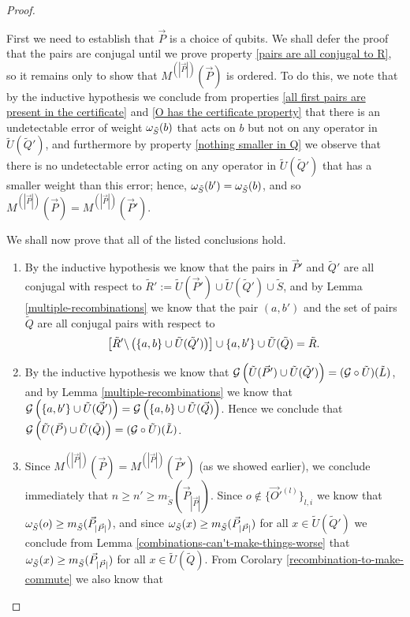 \documentclass[twocolumn,showpacs,preprintnumbers,amsmath,amssymb,nofootinbib,pra,floatfix]{revtex4-1}
\newcommand{\lst}{\vec}
\newcommand{\set}{\tilde}
\newcommand{\genfun}{\mathcal{G}}
\begin{document}
\begin{proof}
\begin{description}
First we need to establish that $\lst P$ is a choice of qubits.  We shall defer the proof that the pairs are conjugal until we prove property \ref{pairs are all conjugal to R}, so it remains only to show that $M^{(|\lst P|)}(\lst P)$ is ordered.  To do this, we note that by the inductive hypothesis we conclude from properties \ref{all first pairs are present in the certificate} and \ref{O has the certificate property} that there is an  undetectable error of weight $\om_{\set S}(b)$ that acts on $b$ but not on any operator in $\set U(\set Q')$, and furthermore by property \ref{nothing smaller in Q} we observe that there is no undetectable error acting on any operator in $\set U(\set Q')$ that has a smaller weight than this error;  hence, $\om_{\set S}(b')=\om_{\set S}(b)$, and so $M^{(|\lst P|)}(\lst P)=M^{(|\lst P|)}(\lst P')$.

We shall now prove that all of the listed conclusions hold.
\begin{enumerate}
\item By the inductive hypothesis we know that the pairs in $\lst P'$ and $\set Q'$ are all conjugal with respect to $\set R' := \set U(\lst P')\cup \set U(\set Q')\cup \set S$, and by Lemma \ref{multiple-recombinations} we know that the pair $(a,b')$ and the set of pairs $\set Q$ are all conjugal pairs with respect to
$$\left[\set R'\backslash\paren{\{a,b\} \cup \set U(\set Q')}\right]\cup \{a,b'\} \cup \set U(\set Q)=\set R.$$

\item By the inductive hypothesis we know that $\genfun\paren{\set U(\lst P')\cup \set U(\set Q')}=(\genfun\circ\set U)(\set L)$, and by Lemma \ref{multiple-recombinations} we know that $\genfun\paren{\{a,b'\}\cup \set U(\lst Q')}=\genfun\paren{\{a,b\}\cup \set U(\lst Q)}$.  Hence we conclude that $\genfun\paren{\set U(\lst P)\cup \set U(\set Q)}=(\genfun\circ\set U)(\set L)$.

\item Since $M^{(|\lst P|)}(\lst P)=M^{(|\lst P|)}(\lst P')$ (as we showed earlier), we conclude immediately that $n \ge n' \ge m_{\set S}(\lst P_{|\lst P|})$.  Since $o\notin \{\lst O'^{(l)}\}_{l,i}$ we know that $\om_{\set S}(o)\ge m_{\set S}(\lst P_{|\lst P|})$, and since $\om_{\set S}(x)\ge m_{\set S}(\lst P_{|\lst P|})$ for all $x\in\set U(\set Q')$ we conclude from Lemma \ref{combinations-can't-make-things-worse} that $\om_{\set S}(x)\ge m_{\set S}(\lst P_{|\lst P|})$ for all $x\in\set U(\set Q)$.  From Corolary \ref{recombination-to-make-commute} we also know that 


\end{enumerate}
\end{description}
\end{proof}
\end{document}
